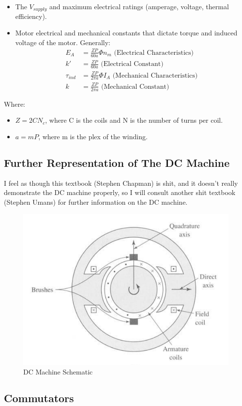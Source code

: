 \documentclass{book}
\begin{document}
\begin{itemize}
	\item The $V_{supply}$ and maximum electrical ratings (amperage, voltage, thermal efficiency).
	\item Motor electrical and mechanical constants that dictate torque and induced voltage of the motor. Generally:
	\begin{align*}
		E_A &= \frac{ZP}{60a} \Phi n_m \text{ (Electrical Characteristics)} \\
		k'&= \frac{ZP}{60 a} \text{ (Electrical Constant)} \\
		\tau_{ind} &= \frac{ZP}{2\pi a} \Phi I_A \text{ (Mechanical Characteristics)} \\
		k &=  \frac{ZP}{2 \pi a} \text{ (Mechanical Constant)}
	\end{align*}
\end{itemize}

Where:
\begin{itemize}
	\item $Z = 2 C N_c$, where C is the coils and N is the number of turns per coil.
	\item $a = mP$, where m is the plex of the winding.
\end{itemize}
\subsection{Further Representation of The DC Machine}

I feel as though this textbook (Stephen Chapman) is shit, and it doesn't really demonstrate the DC machine properly, so I will consult another shit textbook (Stephen Umans) for further information on the DC machine.

\begin{figure}[h]
	\centering
	\includegraphics[width=0.5\linewidth]{Screenshots/DC_machine_schematic}
	\caption{DC Machine Schematic}
	\label{fig:dcmachineschematic}
\end{figure}

\subsection{Commutators}
\end{document}
